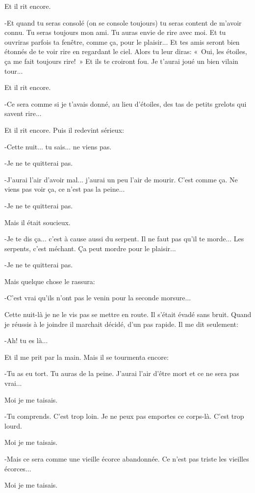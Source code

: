 \documentclass{report}
\begin{document}
Et il rit encore.

-Et quand tu seras consolé (on se console toujours) tu seras content de m'avoir connu. Tu seras toujours mon ami. Tu auras envie de rire avec moi. Et tu ouvriras parfois ta fenêtre, comme ça, pour le plaisir... Et tes amis seront bien étonnés de te voir rire en regardant le ciel. Alors tu leur diras: «~Oui, les étoiles, ça me fait toujours rire!~» Et ils te croiront fou. Je t'aurai joué un bien vilain tour...

Et il rit encore.

-Ce sera comme si je t'avais donné, au lieu d'étoiles, des tas de petits grelots qui savent rire...

Et il rit encore. Puis il redevint sérieux:

-Cette nuit... tu sais... ne viens pas.

-Je ne te quitterai pas.

-J'aurai l'air d'avoir mal... j'aurai un peu l'air de mourir. C'est comme ça. Ne viens pas voir ça, ce n'est pas la peine...

-Je ne te quitterai pas.

Mais il était soucieux.

-Je te dis ça... c'est à cause aussi du serpent. Il ne faut pas qu'il te morde... Les serpents, c'est méchant. Ça peut mordre pour le plaisir...

-Je ne te quitterai pas.

Mais quelque chose le rassura:

-C'est vrai qu'ils n'ont pas le venin pour la seconde morsure...

Cette nuit-là je ne le vis pas se mettre en route. Il s'était évadé sans bruit. Quand je réussis à le joindre il marchait décidé, d'un pas rapide. Il me dit seulement:

-Ah! tu es là...

Et il me prit par la main. Mais il se tourmenta encore:

-Tu as eu tort. Tu auras de la peine. J'aurai l'air d'être mort et ce ne sera pas vrai...

Moi je me taisais.

-Tu comprends. C'est trop loin. Je ne peux pas emportes ce corps-là. C'est trop lourd.

Moi je me taisais.

-Mais ce sera comme une vieille écorce abandonnée. Ce n'est pas triste les vieilles écorces...

Moi je me taisais.
\end{document}
